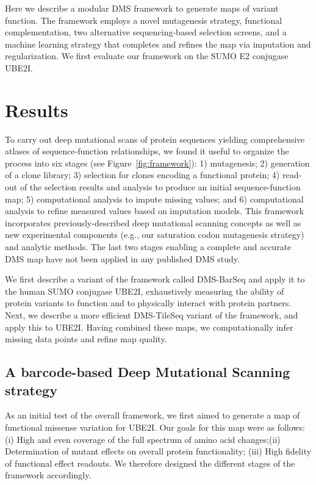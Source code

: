 Here we describe a modular DMS framework to generate maps of variant function. The framework employs a novel mutagenesis strategy, functional complementation, two alternative sequencing-based selection screens, and a machine learning strategy that completes and refines the map via imputation and regularization. We first evaluate our framework on the SUMO E2 conjugase UBE2I.

\section{Results}

To carry out deep mutational scans of protein sequences yielding comprehensive atlases of sequence-function relationships, we found it useful to organize the process into six stages (see Figure~\ref{fig:framework}): 1) mutagenesis; 2) generation of a clone library; 3) selection for clones encoding a functional protein; 4) read-out of the selection results and analysis to produce an initial sequence-function map; 5) computational analysis to impute missing values; and 6) computational analysis to refine measured values based on imputation models. This framework incorporates previously-described deep mutational scanning concepts as well as new experimental components (e.g., our saturation codon mutagenesis strategy) and analytic methods.  The last two stages enabling a complete and accurate DMS map have not been applied in any published DMS study.

We first describe a variant of the framework called DMS-BarSeq and apply it to the human SUMO conjugase UBE2I, exhaustively measuring the ability of protein variants to function and to physically interact with protein partners.  Next, we describe a more efficient DMS-TileSeq variant of the framework, and apply this to UBE2I.  Having combined these maps, we computationally infer missing data points and refine map quality.

\subsection{A barcode-based Deep Mutational Scanning strategy}


As an initial test of the overall framework, we first aimed to generate a map of functional missense variation for UBE2I. Our goals for this map were as follows: (i) High and even coverage of the full spectrum of amino acid changes;(ii) Determination of mutant effects on overall protein functionality; (iii) High fidelity of functional effect readouts. We therefore designed the different stages of the framework accordingly. 

